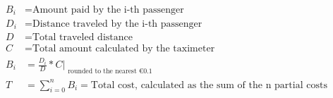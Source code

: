 \documentclass[preview]{standalone}
\begin{document}
\begin{align*}
 B_{i} &= \text{Amount paid by the i-th passenger} \\
 D_{i} &= \text{Distance traveled by the i-th passenger} \\
 D &= \text{Total traveled distance} \\
 C &= \text{Total amount calculated by the taximeter} \\
 B_{i} &= \frac{D_{i}}{D} * C |_{\substack{\text{rounded to the nearest €0.1 }}} \\
 T &= \sum_{i=0}^{n} B_{i} = \text{Total cost, calculated as the sum of the n partial costs}
\end{align*}
\end{document}
